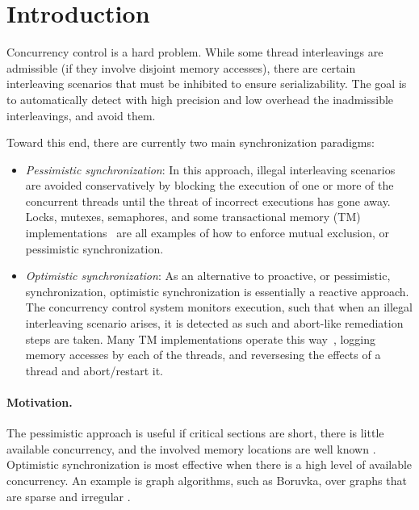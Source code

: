 \section{Introduction}\label{Se:intro}

Concurrency control is a hard problem. While some thread interleavings are admissible (if they involve disjoint memory accesses), there are certain interleaving scenarios that must be inhibited to ensure serializability. The goal is to automatically detect with high precision and low overhead the inadmissible interleavings, and avoid them.  

Toward this end, there are currently two main synchronization paradigms:
\begin{itemize}
	\item \textit{Pessimistic synchronization}: In this approach, illegal interleaving scenarios are avoided conservatively by blocking the execution of one or more of the concurrent threads until the threat of incorrect executions has gone away. Locks, mutexes, semaphores, and some transactional memory (TM) implementations~\cite{ppopp/HerlihyK08,nirpess} are all examples of how to enforce mutual exclusion, or pessimistic synchronization.
	\item \textit{Optimistic synchronization}: As an alternative to proactive, or pessimistic, synchronization, optimistic synchronization is essentially a reactive approach. The concurrency control system monitors execution, such that when an illegal interleaving scenario arises, it is detected as such and abort-like remediation steps are taken. Many TM implementations operate this way~\cite{DBLP:conf/isca/HerlihyM93}, logging memory accesses by each of the threads, and reversesing the effects of a thread and abort/restart it.
\end{itemize}

\paragraph{Motivation.} The pessimistic approach is useful if critical sections are short, there is little available concurrency, and the involved memory locations are well known \cite{AndiKleen}. Optimistic synchronization is most effective when there is a high level of available concurrency. An example is graph algorithms, such as Boruvka, over graphs that are sparse and irregular \cite{KulkarniGalois}.
%


